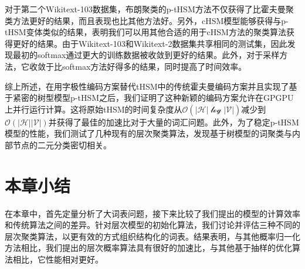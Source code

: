 对于第二个Wikitext-103数据集，布朗聚类的p-tHSM方法不仅获得了比霍夫曼聚类方法更好的结果，而且表现也比其他方法好。另外，cHSM模型能够获得与p-tHSM变体类似的结果，表明我们可以用其他合适的用于cHSM方法的聚类算法获得更好的结果。由于Wikitext-103和Wikitext-2数据集共享相同的测试集，因此发现最初的softmax通过更大的训练数据被收敛到更好的结果。此外，对于采样方法，它收敛于比softmax方法好得多的结果，同时提高了时间效率。

综上所述，在用字极性编码方案替代tHSM中的传统霍夫曼编码方案并且实现了基于紧密的树型模型p-tHSM之后，我们证明了这种新颖的编码方案允许在GPGPU上并行运行计算。这将原始tHSM的时间复杂度从$ \mathcal {O(| H | \log | V |)} $减少到$\mathcal{O(| H || V |)} $并获得了最佳的加速比对于大量的词汇问题。此外，为了稳定p-tHSM模型的性能，我们测试了几种现有的层次聚类算法，发现基于树模型的词聚类与内部节点的二元分类密切相关。

\section{本章小结}

在本章中，首先定量分析了大词表问题，接下来比较了我们提出的模型的计算效率和传统算法之间的差异。针对层次模型的初始化算法，我们讨论并评估三种不同的层次聚类算法，以更有效的方式组织结构化的词表。结果表明，与其他概率归一化方法相比，我们提出的层次概率算法具有很好的加速比，与其他基于抽样的优化算法相比，它性能相对更好。

